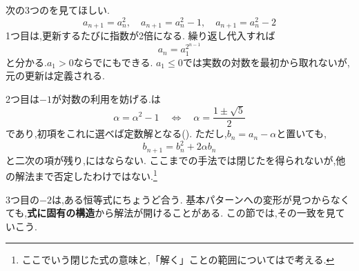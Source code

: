 次の3つのを見てほしい.
\[
  a_{n+1}=a_n^2,
  \quad
  a_{n+1}=a_n^2-1,
  \quad
  a_{n+1}=a_n^2-2
\]
1つ目は,更新するたびに指数が2倍になる.
繰り返し代入すれば
\[
  a_n=a_1^{2^{n-1}}
\]
と分かる.$a_1>0$ならでにもできる.
$a_1\le0$では実数の対数を最初から取れないが,元の更新は定義される.

2つ目は$-1$が対数の利用を妨げる.は
\[
  \alpha=\alpha^2-1
  \quad\Longleftrightarrow\quad
  \alpha=\frac{1\pm\sqrt5}{2}
\]
であり,初項をこれに選べば定数解となる().
ただし,$b_n=a_n-\alpha$と置いても,
\[
  b_{n+1}=b_n^2+2\alpha b_n
\]
と二次の項が残り,にはならない.
ここまでの手法では閉じたを得られないが,他の解法まで否定したわけではない.\footnote{ここでいう閉じた式の意味と,「解く」ことの範囲についてはで考える.}

3つ目の$-2$は,ある恒等式にちょうど合う.
基本パターンへの変形が見つからなくても,\textbf{式に固有の構造}から解法が開けることがある.
この節では,その一致を見ていこう.
